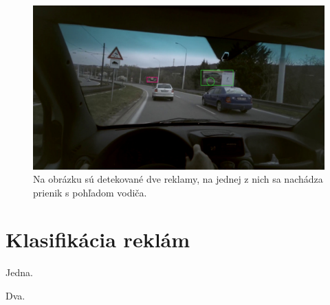  \begin{figure}[ht]
     \centering
     \includegraphics[width=1\textwidth]{images/04/iou.jpg}
     \caption{Na obrázku sú detekované dve reklamy, na jednej z nich sa nachádza prienik s pohľadom vodiča.}
     \label{img:tracking}
 \end{figure}

\section{Klasifikácia reklám}

Jedna.

\newpage

Dva.

